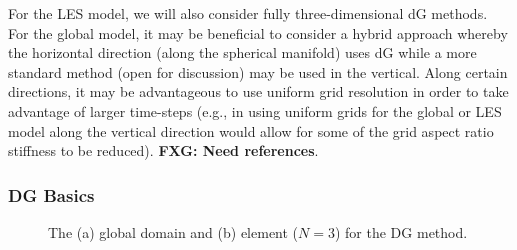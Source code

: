 \documentclass[12pt]{article}
\begin{document}
For the LES model, we will also consider fully three-dimensional dG methods. For the global model, it may be beneficial to consider a hybrid approach whereby the horizontal direction (along the spherical manifold) uses dG while a more standard method (open for discussion) may be used in the vertical.  Along certain directions, it may be advantageous to use uniform grid resolution in order to take advantage of larger time-steps (e.g., in using uniform grids for the global or LES model along the vertical direction would allow for some of the grid aspect ratio stiffness to be reduced).  \textbf{FXG: Need references}.

\subsubsection{DG Basics}

\begin{figure}[htbp]
\begin{center}
\end{center}
\caption{The (a) global domain and (b) element ($N=3$) for the DG method.}
\label{fig:spatial_discretization/dg_method}
\end{figure}
\end{document}
